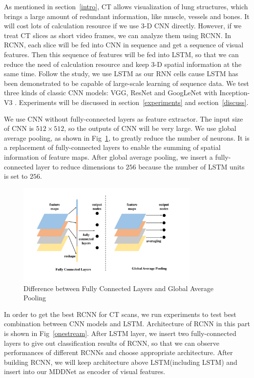 \documentclass[journal]{IEEEtran}
\begin{document}
As mentioned in section~\ref{intro}, CT allows visualization of lung structures, which brings a large amount of redundant information, like muscle, vessels and bones. It will cost lots of calculation resource if we use 3-D CNN directly. However, if we treat CT slices as short video frames, we can analyze them using RCNN. In RCNN, each slice will be fed into CNN in sequence and get a sequence of visual features. Then this sequence of features will be fed into LSTM, so that we can reduce the need of calculation resource and keep 3-D spatial information at the same time. 
Follow the study\cite{Donahue2015Long}, we use LSTM as our RNN cells cause LSTM has been demonstrated to be capable of large-scale learning of sequence data. We test three kinds of classic CNN models: VGG\cite{simonyan2015very}, ResNet\cite{he2016deep} and GoogLeNet with Inception-V3 \cite{szegedy2016rethinking}. Experiments will be discussed in section~\ref{experiments} and section~\ref{discuss}.

We use CNN without fully-connected layers as feature extractor. The input size of CNN is $512 \times 512$, so the outputs of CNN will be very large. We use global average pooling\cite{lin2014network}, as shown in Fig~\ref{gap}, to greatly reduce the number of neurons. It is a replacement of fully-connected layers to enable the summing of spatial information of feature maps. After global average pooling, we insert a fully-connected layer to reduce dimensions to $256$ because the number of LSTM units is set to $256$\cite{Donahue2015Long}.

\begin{figure}[htb]
    \centerline{\includegraphics[width=90mm]{gap.pdf}}
    \vspace{-0cm}
    \caption{Difference between Fully Connected Layers and Global Average Pooling}
    \vspace{-0cm}
    \label{gap}
    \end{figure}

In order to get the best RCNN for CT scans, we run experiments to test best combination between CNN models and LSTM. Architecture of RCNN in this part is shown in Fig~\ref{onestream}. After LSTM layer, we insert two fully-connected layers to give out classification results of RCNN, so that we can observe performances of different RCNNs and choose appropriate architecture. After building RCNN, we will keep architecture above LSTM(including LSTM) and insert into our MDDNet as encoder of visual features.
\end{document}
